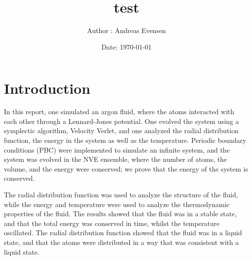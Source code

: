 \documentclass[a4paper]{article}
\title{test}
\author{Author : Andreas Evensen}
\date{Date: \today}
\newcommand{\newparagraph}{\vspace{.5cm}\noindent}
\begin{document}


\newpage
{}
\setcounter{page}{1}
\newpage
\tableofcontents
\newpage
{}

\section{Introduction}
In this report, one simulated an argon fluid, where the atoms interacted with each other through a Lennard-Jones potential.
One evolved the system using a symplectic algorithm, Velocity Verlet, and one analyzed the radial distribution function, the energy in the system as well as the temperature.
Periodic boundary conditions (PBC) were implemented to simulate an infinite system, and the system was evolved in the NVE ensemble, where the number of atoms, the volume, and the energy were conserved; we prove that the energy of the system is conserved.

\newparagraph
The radial distribution function was used to analyze the structure of the fluid, while the energy and temperature were used to analyze the thermodynamic properties of the fluid.
The results showed that the fluid was in a stable state, and that the total energy was conserved in time, whilst the temperature oscillated.
The radial distribution function showed that the fluid was in a liquid state, and that the atoms were distributed in a way that was consistent with a liquid state.
\end{document}

